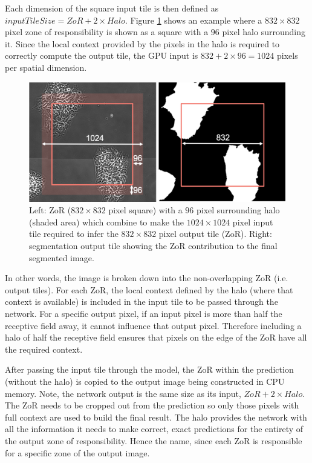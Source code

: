 \documentclass[10pt, indentfirst]{article}
\begin{document}
Each dimension of the square input tile is then defined as $inputTileSize = ZoR + 2 \times Halo$. 
Figure \ref{fig:zor} shows an example where a $832 \times 832$ pixel zone of responsibility is shown as a square with a $96$ pixel halo surrounding it. 
Since the local context provided by the pixels in the halo is required to correctly compute the output tile, the GPU input is $832 + 2 \times 96 = 1024$ pixels per spatial dimension. 

\begin{figure}
	\centering
	\includegraphics[width=\linewidth]{figs/zor.png}
	\caption{Left: ZoR ($832 \times 832$ pixel square) with a $96$ pixel surrounding halo (shaded area) which combine to make the $1024 \times 1024$ pixel input tile required to infer the $832 \times 832$ pixel output tile (ZoR). Right: segmentation output tile showing the ZoR contribution to the final segmented image.}
	\label{fig:zor}
\end{figure}

In other words, the image is broken down into the non-overlapping ZoR (i.e. output tiles). For each ZoR, the local context defined by the halo (where that context is available) is included in the input tile to be passed through the network. For a specific output pixel, if an input pixel is more than half the receptive field away, it cannot influence that output pixel. Therefore including a halo of half the receptive field ensures that pixels on the edge of the ZoR have all the required context.

After passing the input tile through the model, the ZoR within the prediction (without the halo) is copied to the output image being constructed in CPU memory. Note, the network output is the same size as its input, $ZoR + 2 \times Halo$. The ZoR needs to be cropped out from the prediction so only those pixels with full context are used to build the final result. The halo provides the network with all the information it needs to make correct, exact predictions for the entirety of the output zone of responsibility. Hence the name, since each ZoR is responsible for a specific zone of the output image. 
\end{document}
